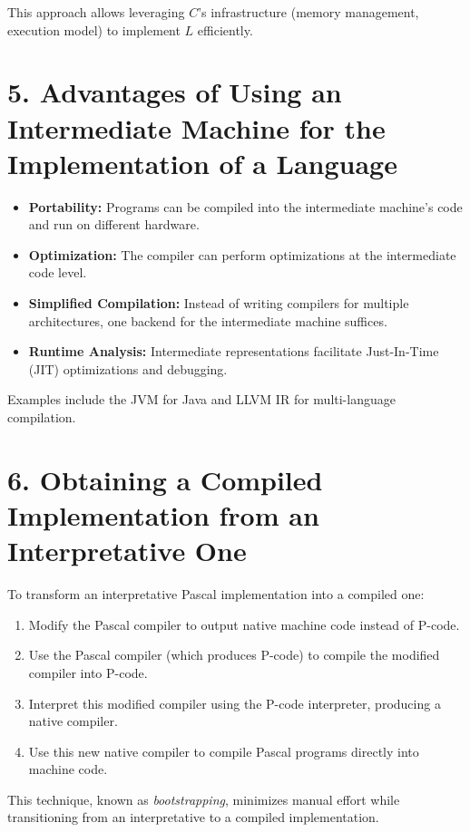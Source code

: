 \documentclass{article}
\begin{document}
This approach allows leveraging \( C \)’s infrastructure (memory management, execution model) to implement \( L \) efficiently.

\section*{5. Advantages of Using an Intermediate Machine for the Implementation of a Language}

\begin{itemize}
    \item \textbf{Portability:} Programs can be compiled into the intermediate machine’s code and run on different hardware.
    \item \textbf{Optimization:} The compiler can perform optimizations at the intermediate code level.
    \item \textbf{Simplified Compilation:} Instead of writing compilers for multiple architectures, one backend for the intermediate machine suffices.
    \item \textbf{Runtime Analysis:} Intermediate representations facilitate Just-In-Time (JIT) optimizations and debugging.
\end{itemize}

Examples include the JVM for Java and LLVM IR for multi-language compilation.

\section*{6. Obtaining a Compiled Implementation from an Interpretative One}

To transform an interpretative Pascal implementation into a compiled one:

\begin{enumerate}
    \item Modify the Pascal compiler to output native machine code instead of P-code.
    \item Use the Pascal compiler (which produces P-code) to compile the modified compiler into P-code.
    \item Interpret this modified compiler using the P-code interpreter, producing a native compiler.
    \item Use this new native compiler to compile Pascal programs directly into machine code.
\end{enumerate}

This technique, known as \textit{bootstrapping}, minimizes manual effort while transitioning from an interpretative to a compiled implementation.
\end{document}
